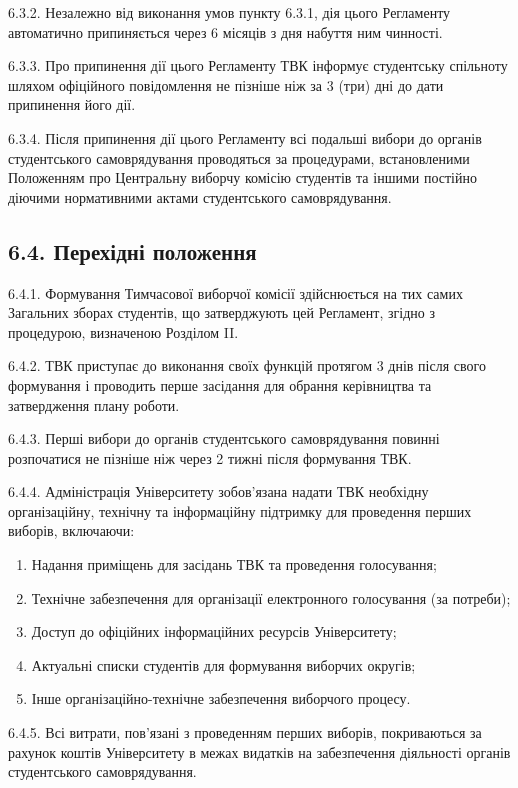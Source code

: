     6.3.2. Незалежно від виконання умов пункту 6.3.1, дія цього Регламенту автоматично припиняється через 6 місяців з дня набуття ним чинності.

    6.3.3. Про припинення дії цього Регламенту ТВК інформує студентську спільноту шляхом офіційного повідомлення не пізніше ніж за 3 (три) дні до дати припинення його дії.

    6.3.4. Після припинення дії цього Регламенту всі подальші вибори до органів студентського самоврядування проводяться за процедурами, встановленими Положенням про Центральну виборчу комісію студентів та іншими постійно діючими нормативними актами студентського самоврядування.

\subsection*{6.4. Перехідні положення}
    6.4.1. Формування Тимчасової виборчої комісії здійснюється на тих самих Загальних зборах студентів, що затверджують цей Регламент, згідно з процедурою, визначеною Розділом II.

    6.4.2. ТВК приступає до виконання своїх функцій протягом 3 днів після свого формування і проводить перше засідання для обрання керівництва та затвердження плану роботи.

    6.4.3. Перші вибори до органів студентського самоврядування повинні розпочатися не пізніше ніж через 2 тижні після формування ТВК.

    6.4.4. Адміністрація Університету зобов'язана надати ТВК необхідну організаційну, технічну та інформаційну підтримку для проведення перших виборів, включаючи:

        \begin{enumerate}[label=\alph*)]
            \item Надання приміщень для засідань ТВК та проведення голосування;
            \item Технічне забезпечення для організації електронного голосування (за потреби);
            \item Доступ до офіційних інформаційних ресурсів Університету;
            \item Актуальні списки студентів для формування виборчих округів;
            \item Інше організаційно-технічне забезпечення виборчого процесу.
        \end{enumerate}

    6.4.5. Всі витрати, пов'язані з проведенням перших виборів, покриваються за рахунок коштів Університету в межах видатків на забезпечення діяльності органів студентського самоврядування.

